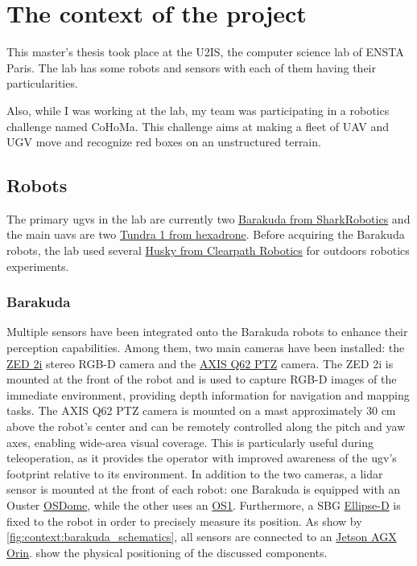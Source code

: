 \chapter{The context of the project}\label{ch:context}

This master's thesis took place at the U2IS, the computer science lab of ENSTA Paris.
The lab has some robots and sensors with each of them having their particularities.

Also, while I was working at the lab, my team was participating in a robotics challenge named CoHoMa.
This challenge aims at making a fleet of UAV and UGV move and recognize red boxes on an unstructured terrain.


\section{Robots}\label{sec:robots}

The primary \gls{ugv}s in the lab are currently two \href{https://www.shark-robotics.com/robots/barakuda-mule-robot}{Barakuda from SharkRobotics}
and the main \gls{uav}s are two \href{https://www.hexadrone.fr/produits/drone-tundra/}{Tundra 1 from hexadrone}.
Before acquiring the Barakuda robots, the lab used several
\href{https://clearpathrobotics.com/husky-a300-unmanned-ground-vehicle-robot/}{Husky from Clearpath Robotics} for
outdoors robotics experiments.

\subsection{Barakuda}\label{subsec:barakuda}

Multiple sensors have been integrated onto the Barakuda robots to enhance their perception capabilities.
Among them, two main cameras have been installed: the \href{https://www.stereolabs.com/en-fr/products/zed-2}{ZED 2i} stereo RGB-D camera and the \href{https://www.axis.com/products/axis-q62-series}{AXIS Q62 PTZ} camera.
The ZED 2i is mounted at the front of the robot and is used to capture RGB-D images of the immediate environment, providing depth information for navigation and mapping tasks.
The AXIS Q62 PTZ camera is mounted on a mast approximately 30 cm above the robot's center and can be remotely controlled along the pitch and yaw axes, enabling wide-area visual coverage.
This is particularly useful during teleoperation, as it provides the operator with improved awareness of the \gls{ugv}'s footprint relative to its environment.
In addition to the two cameras, a \gls{lidar} sensor is mounted at the front of each robot: one Barakuda is equipped with an Ouster \href{https://ouster.com/products/hardware/osdome-lidar-sensor}{OSDome},
while the other uses an \href{https://ouster.com/products/hardware/os1-lidar-sensor}{OS1}.
Furthermore, a SBG \href{https://www.sbg-systems.com/ins/ellipse-d/}{Ellipse-D} is fixed to the robot in order to precisely measure its position.
As show by \cref{fig:context:barakuda_schematics}, all sensors are connected to an \href{https://www.nvidia.com/en-us/autonomous-machines/embedded-systems/jetson-orin/#nv-title-8b7137e4b5}{Jetson AGX Orin}.
 show the physical positioning of the discussed components.


